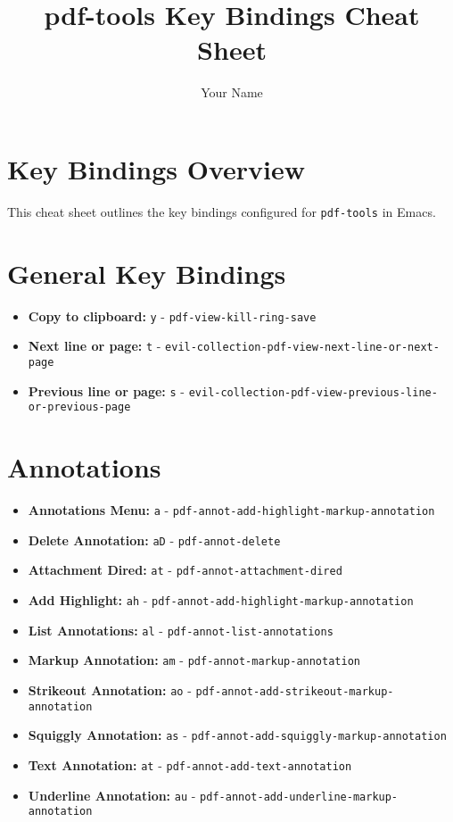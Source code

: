 \documentclass[a4paper,10pt]{article}
\title{pdf-tools Key Bindings Cheat Sheet}
\author{Your Name}
\date{}
\begin{document}
\maketitle

\section*{Key Bindings Overview}

This cheat sheet outlines the key bindings configured for \texttt{pdf-tools} in Emacs.

\section*{General Key Bindings}
\begin{itemize}
    \item \textbf{Copy to clipboard:} \texttt{y} - \texttt{pdf-view-kill-ring-save}
    \item \textbf{Next line or page:} \texttt{t} - \texttt{evil-collection-pdf-view-next-line-or-next-page}
    \item \textbf{Previous line or page:} \texttt{s} - \texttt{evil-collection-pdf-view-previous-line-or-previous-page}
\end{itemize}

\section*{Annotations}
\begin{itemize}
    \item \textbf{Annotations Menu:} \texttt{a} - \texttt{pdf-annot-add-highlight-markup-annotation}
    \item \textbf{Delete Annotation:} \texttt{aD} - \texttt{pdf-annot-delete}
    \item \textbf{Attachment Dired:} \texttt{at} - \texttt{pdf-annot-attachment-dired}
    \item \textbf{Add Highlight:} \texttt{ah} - \texttt{pdf-annot-add-highlight-markup-annotation}
    \item \textbf{List Annotations:} \texttt{al} - \texttt{pdf-annot-list-annotations}
    \item \textbf{Markup Annotation:} \texttt{am} - \texttt{pdf-annot-markup-annotation}
    \item \textbf{Strikeout Annotation:} \texttt{ao} - \texttt{pdf-annot-add-strikeout-markup-annotation}
    \item \textbf{Squiggly Annotation:} \texttt{as} - \texttt{pdf-annot-add-squiggly-markup-annotation}
    \item \textbf{Text Annotation:} \texttt{at} - \texttt{pdf-annot-add-text-annotation}
    \item \textbf{Underline Annotation:} \texttt{au} - \texttt{pdf-annot-add-underline-markup-annotation}
\end{itemize}
\end{document}
